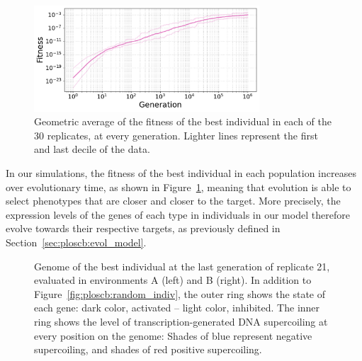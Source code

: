 \begin{figure}[H]
  \centering
  \hspace{-1.2cm}
  \includegraphics[width=0.75\textwidth]{ploscb/img/all_fitness.pdf}
  \caption[Average fitness during evolution in the advanced model]{Geometric average of the fitness of the best individual in each of the 30 replicates, at every generation.
  Lighter lines represent the first and last decile of the data.}
  \label{fig:ploscb:main_fitness}
\end{figure}

In our simulations, the fitness of the best individual in each population increases over evolutionary time, as shown in Figure~\ref{fig:ploscb:main_fitness}, meaning that evolution is able to select phenotypes that are closer and closer to the target. More precisely, the expression levels of the genes of each type in individuals in our model therefore evolve towards their respective targets, as previously defined in Section~\ref{sec:ploscb:evol_model}.

\begin{figure}[H]
  \centering
  \begin{elasticrow}[width=\textwidth]
  \end{elasticrow}
  \caption[Best individual at the end of evolution in one of the replicates in the advanced model, in both environments]{Genome of the best individual at the last generation of replicate 21, evaluated in environments A (left) and B (right).
  In addition to Figure~\ref{fig:ploscb:random_indiv}, the outer ring shows the state of each gene: dark color, activated -- light color, inhibited.
  The inner ring shows the level of transcription-generated DNA supercoiling at every position on the genome: Shades of blue represent negative supercoiling, and shades of red positive supercoiling.}
  \label{fig:ploscb:genomes}
\end{figure}


